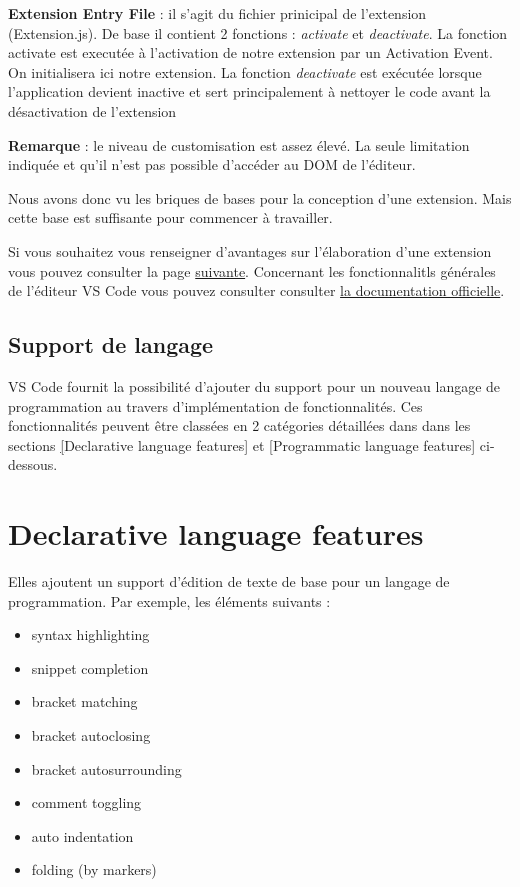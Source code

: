 \documentclass[
    iict, %
    il, %
]{heig-tb}
\begin{document}
\textbf{Extension Entry File} :
il s'agit du fichier prinicipal de l'extension (Extension.js).
De base il contient 2 fonctions : \emph{activate} et \emph{deactivate}.
La fonction activate est executée à l'activation de notre extension par un Activation Event. On initialisera ici notre extension.
La fonction \emph{deactivate} est exécutée lorsque l'application devient inactive et sert principalement à nettoyer le code avant la désactivation de l'extension

\textbf{Remarque} : le niveau de customisation est assez élevé. La seule limitation indiquée et qu'il n'est pas possible d'accéder au DOM de l'éditeur.

Nous avons donc vu les briques de bases pour la conception d'une extension. Mais cette base est suffisante pour commencer à travailler.

Si vous souhaitez vous renseigner d'avantages sur l'élaboration d'une extension vous pouvez consulter la page \href{https://code.visualstudio.com/api}{suivante}.
Concernant les fonctionnalitls générales de l'éditeur VS Code vous pouvez consulter consulter \href{https://code.visualstudio.com/docs}{la documentation officielle}.

\subsection{Support de langage}
VS Code fournit la possibilité d'ajouter du support pour un nouveau langage de programmation au travers d'implémentation de fonctionnalités. Ces fonctionnalités peuvent être classées en 2 catégories détaillées
dans dans les sections \hyperref[Declarative language features][Declarative language features] et \hyperref[Programmatic language features][Programmatic language features] ci-dessous.

\section{Declarative language features}\label{Declarative language features}
Elles ajoutent un support d'édition de texte de base pour un langage de programmation.
Par exemple, les éléments suivants :

\begin{itemize}
    \item syntax highlighting
    \item snippet completion
    \item bracket matching
    \item bracket autoclosing
    \item bracket autosurrounding
    \item comment toggling
    \item auto indentation
    \item folding (by markers)
\end{itemize}
\end{document}
